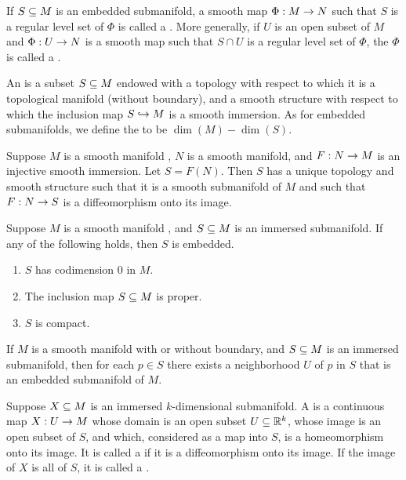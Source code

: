 \dfn If $S\subseteq M$ is an embedded submanifold, a smooth map $\Phi:M\rightarrow N$ such that $S$ is a regular level set of $\Phi$ is called a . More generally, if $U$ is an open subset of $M$ and $\Phi:U\rightarrow N$ is a smooth map such that $S\cap U$ is a regular level set of $\Phi$, the $\Phi$ is called a .

\dfn An  is a subset $S\subseteq M$ endowed with a topology with respect to which it is a topological manifold (without boundary), and a smooth structure with respect to which the inclusion map $S\hookrightarrow M$ is a smooth immersion. As for embedded submanifolds, we define the  to be $\dim(M) - \dim(S)$.

\setcounter{thm}{17}

\begin{prop}
Suppose $M$ is a smooth manifold \wowob, $N$ is a smooth manifold, and $F:N\rightarrow M$ is an injective smooth immersion. Let $S = F(N)$. Then $S$ has a unique topology and smooth structure such that it is a smooth submanifold of $M$ and such that $F:N\rightarrow S$ is a diffeomorphism onto its image.
\end{prop}

\setcounter{thm}{20}

\begin{prop}
Suppose $M$ is a smooth manifold \wowob, and $S\subseteq M$ is an immersed submanifold. If any of the following holds, then $S$ is embedded.
\begin{enumerate}
    \item $S$ has codimension 0 in $M$.
    \item The inclusion map $S\subseteq M$ is proper.
    \item $S$ is compact.
\end{enumerate}
\end{prop}

\begin{prop}
If $M$ is a smooth manifold with or without boundary, and $S\subseteq M$ is an immersed submanifold, then for each $p\in S$ there exists a neighborhood $U$ of $p$ in $S$ that is an embedded submanifold of $M$.
\end{prop}

\dfn Suppose $X\subseteq M$ is an immersed $k$-dimensional submanifold. A  is a continuous map $X:U\rightarrow M$ whose domain is an open subset $U\subseteq \mathbb{R}^k$, whose image is an open subset of $S$, and which, considered as a map into $S$, is a homeomorphism onto its image. It is called a  if it is a diffeomorphism onto its image. If the image of $X$ is all of $S$, it is called a .

